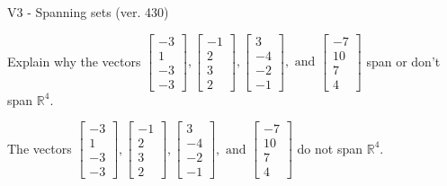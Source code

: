 \begin{exercise}
  \begin{exerciseTitle}V3 - Spanning sets (ver. 430)\end{exerciseTitle}
  \begin{exerciseStatement}
    Explain why the vectors \(\left[\begin{array}{r}
-3 \\
1 \\
-3 \\
-3
\end{array}\right] , \left[\begin{array}{r}
-1 \\
2 \\
3 \\
2
\end{array}\right] , \left[\begin{array}{r}
3 \\
-4 \\
-2 \\
-1
\end{array}\right] , \text{ and } \left[\begin{array}{r}
-7 \\
10 \\
7 \\
4
\end{array}\right]\) span or don't span \(\mathbb{R}^4\). 
	


  \end{exerciseStatement}
  \begin{exerciseAnswer}
   The vectors \(\left[\begin{array}{r}
-3 \\
1 \\
-3 \\
-3
\end{array}\right] , \left[\begin{array}{r}
-1 \\
2 \\
3 \\
2
\end{array}\right] , \left[\begin{array}{r}
3 \\
-4 \\
-2 \\
-1
\end{array}\right] , \text{ and } \left[\begin{array}{r}
-7 \\
10 \\
7 \\
4
\end{array}\right]\) 
  	 do not  
	span \(\mathbb{R}^4\).
  


  \end{exerciseAnswer}
\end{exercise}